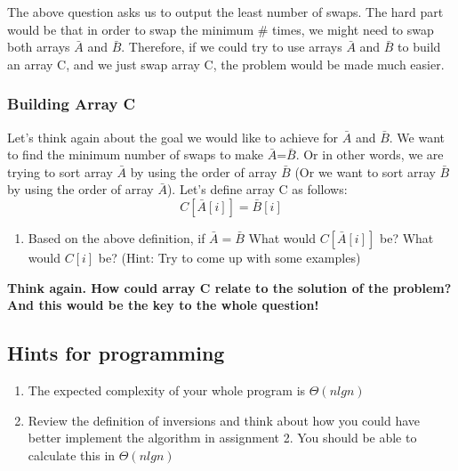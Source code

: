 \documentclass{article}
\begin{document}
\begin{enumerate}
\begin{enumerate}
\end{enumerate}
The above question asks us to output the least number of swaps. The hard part would be that in order to swap the minimum \# times, we might need to swap both arrays $\bar{A}$ and $\bar{B}$. Therefore, if we could try to use arrays $\bar{A}$ and $\bar{B}$ to build an array C, and we just swap array C, the problem would be made much easier. 

\subsubsection{Building Array C}
Let's think again about the goal we would like to achieve for $\bar{A}$ and $\bar{B}$. We want to find the minimum number of swaps to make $\bar{A}$=$\bar{B}$. Or in other words, we are trying to sort array $\bar{A}$ by using the order of array $\bar{B}$ (Or we want to sort array $\bar{B}$ by using the order of  array $\bar{A}$).
Let's define array C as follows:$$C[\bar{A}[i]]=\bar{B}[i]$$
\begin{enumerate}\addtocounter{enumi}{3}
  \item Based on the above definition, if $\bar{A}=\bar{B}$ What would $C[ \bar{A}[i]]$ be? What would $C[i]$ be? (Hint: Try to come up with some examples)
  \vspace{60 mm}
\end{enumerate}
\textbf{Think again. How could array C relate to the solution of the problem? And this would be the key to the whole question!}

\subsection{Hints for programming}
\begin{enumerate}
    \item The expected complexity of your whole program is $\Theta(nlgn)$
    \item Review the definition of inversions and think about how you could have better implement the algorithm in assignment 2. You should be able to calculate this in $\Theta(nlgn)$
\end{enumerate}
\end{enumerate}
\end{document}
